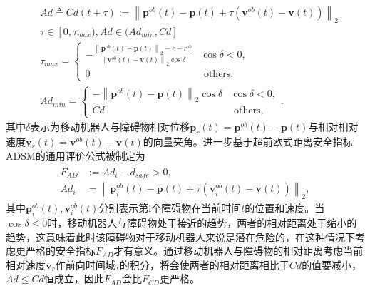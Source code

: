 \documentclass[preprint,5p,times,twocolumn]{elsarticle}
\begin{document}
\begin{subequations}
\begin{align}
\label{eq.AED}
&Ad \triangleq Cd(t+\tau) := \left\|\boldsymbol{p}^{ob}(t)-\boldsymbol{p}(t)+\tau \left(\boldsymbol{v}^{ob}(t)-\boldsymbol{v}(t)\right)\right\|_2\\
&\tau \in [0,\tau_{max}), Ad \in (Ad_{min}, Cd] \label{eq:AED-1}\\
&\tau_{max}= \begin{cases} -\frac{\left\|\boldsymbol{p}^{ob}(t)-\boldsymbol{p}(t)\right\|_2 - r - r^{ob} }{\left\|\boldsymbol{v}^{ob}(t)-\boldsymbol{v}(t)\right\|_2 \cos{\delta}} & \cos{\delta} <0, \\ 0 & \text { others, }\end{cases} \label{eq:AED-2} \\
& Ad_{min}= \begin{cases}-\left\|\boldsymbol{p}^{ob}(t)-\boldsymbol{p}(t)\right\|_2 \cos{\delta} & \cos{\delta} <0, \\ Cd & \text { others},\end{cases}, \label{eq:AED-3}
\end{align}
\end{subequations}
其中$\delta$表示为移动机器人与障碍物相对位移$\boldsymbol{p}_{r}(t)=\boldsymbol{p}^{ob}(t)-\boldsymbol{p}(t)$与相对相对速度$\boldsymbol{v}_{r}(t)=\boldsymbol{v}^{ob}(t)-\boldsymbol{v}(t)$的向量夹角。进一步基于超前欧式距离安全指标ADSM的通用评价公式被制定为
\begin{equation}
\begin{aligned}
\label{eq.security certificate2}
F_{AD}^i&:=Ad_i-d_{safe}>0,\\
Ad_i&=\left\|\boldsymbol{p}^{ob}_i(t)-\boldsymbol{p}(t)+\tau \left(\boldsymbol{v}^{ob}_i(t)-\boldsymbol{v}(t)\right)\right\|_2,
\end{aligned}
\end{equation}
其中$\boldsymbol{p}^{ob}_i(t),\boldsymbol{v}^{ob}_i(t)$分别表示第i个障碍物在当前时间$t$的位置和速度。当$\cos{\delta} \le 0$时，移动机器人与障碍物处于接近的趋势，两者的相对距离处于缩小的趋势，这意味着此时该障碍物对于移动机器人来说是潜在危险的，在这种情况下考虑更严格的安全指标$F_{AD}$才有意义。通过移动机器人与障碍物的相对距离考虑当前相对速度$\boldsymbol{v}_r$作前向时间域$\tau$的积分，将会使两者的相对距离相比于$Cd$的值要减小，$Ad \leq Cd$恒成立，因此$F_{AD}$会比$F_{CD}$更严格。
\end{document}
